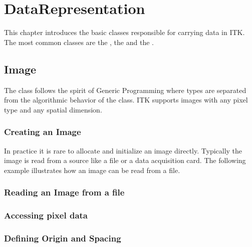 
\chapter{DataRepresentation}
\label{sec:DataRepresentation}


This chapter introduces the basic classes responsible
for carrying data in ITK. The most common classes are the
, the  and the .

\section{Image}
\label{sec:ImageSection}

The  class follows the spirit of Generic Programming where types
are separated from the algorithmic behavior of the class.  ITK supports images
with any pixel type and any spatial dimension.

\subsection{Creating an Image}\label{sec:CreatingAnImageSection}




In practice it is rare to allocate and initialize an image directly.
Typically the image is read from a source like a file or a data acquisition
card. The following example illustrates how an image can be read from
a file.




\subsection{Reading an Image from a file}
\label{sec:ReadingImageFromFile}







\subsection{Accessing pixel data}
\label{sec:AccessingImagePixelData}






\subsection{Defining Origin and Spacing}
\label{sec:DefiningImageOriginAndSpacing}

